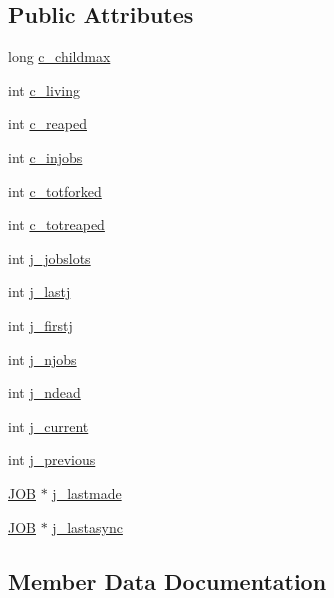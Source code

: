 \subsection*{Public Attributes}
\begin{DoxyCompactItemize}
\item 
long \hyperlink{structjobstats_a3c74d4692759e4d8ec8089acefa23583}{c\+\_\+childmax}
\item 
int \hyperlink{structjobstats_a62da0e16fcd2ac8946942b8502ed3aef}{c\+\_\+living}
\item 
int \hyperlink{structjobstats_a9eba978ad89cdb8068837ea21189d4c9}{c\+\_\+reaped}
\item 
int \hyperlink{structjobstats_a99f41bab1480f94d10a98bddfe502948}{c\+\_\+injobs}
\item 
int \hyperlink{structjobstats_abecf408f2e3333f79205219911e32243}{c\+\_\+totforked}
\item 
int \hyperlink{structjobstats_a7004d60376bd1c7c3885598bc1038603}{c\+\_\+totreaped}
\item 
int \hyperlink{structjobstats_ad107b5818741c0309ebdb7af7318309e}{j\+\_\+jobslots}
\item 
int \hyperlink{structjobstats_ac29ea4e478fa590943c6f7ae902f3a46}{j\+\_\+lastj}
\item 
int \hyperlink{structjobstats_a41979e2d342c40d347381152156fc26d}{j\+\_\+firstj}
\item 
int \hyperlink{structjobstats_a3cd30b59b6ea29dc4d58020e6004d718}{j\+\_\+njobs}
\item 
int \hyperlink{structjobstats_a5c5a5b94e26c657b8caef74571c311ec}{j\+\_\+ndead}
\item 
int \hyperlink{structjobstats_ab72b09f6f206832a608cd245d513cca5}{j\+\_\+current}
\item 
int \hyperlink{structjobstats_a10c9a2fa68d7fed880e9f9c5f2b4d7f8}{j\+\_\+previous}
\item 
\hyperlink{jobs_8h_a9f9c26ac1579020577aabcd357e0c98b}{J\+OB} $\ast$ \hyperlink{structjobstats_ae904f7592ededb2bf0effc72444aab81}{j\+\_\+lastmade}
\item 
\hyperlink{jobs_8h_a9f9c26ac1579020577aabcd357e0c98b}{J\+OB} $\ast$ \hyperlink{structjobstats_aa7884beee2ac8c9f5da5c93ed57988b5}{j\+\_\+lastasync}
\end{DoxyCompactItemize}


\subsection{Member Data Documentation}
